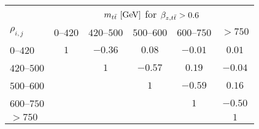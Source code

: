 \begin{table}[!htp]\centering
\caption{ }
\begin{tabular}{l c c c c c }
  \toprule
  &\multicolumn{5}{c}{$m_{t\bar{t}}{}~[\rm{GeV}]$ for $\beta_{z,t\bar{t}}{}> 0.6$}    \\
  $\rho_{i,j}$ & $0$--$420$ & $420$--$500$ & $500$--$600$ & $600$--$750$ & $>750$ \\
  \midrule
  $0$--$420$      & $1$ & $-0.36$ & $0.08$  & $-0.01$ & $0.01$  \\
  $420$--$500$    &     & $1$     & $-0.57$ & $0.19$  & $-0.04$ \\
  $500$--$600$    &     &         & $1$     & $-0.59$ & $0.16$  \\
  $600$--$750$    &     &         &         & $1$     & $-0.50$ \\
  $>750$          &     &         &         &         & $1$     \\
  \bottomrule
\end{tabular}
\label{tab:corr_mtt_beta}
\end{table}

